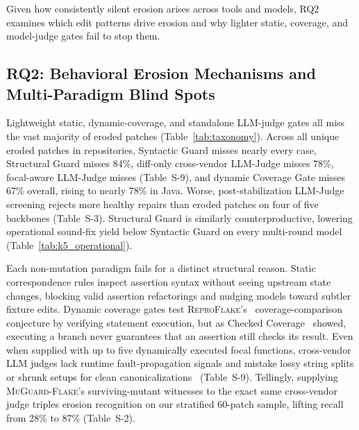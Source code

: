 

\medskip
\noindent{}
\medskip

Given how consistently silent erosion arises across tools and models, RQ2 examines which edit patterns drive erosion and why lighter static, coverage, and model-judge gates fail to stop them.

\subsection{RQ2: Behavioral Erosion Mechanisms and Multi-Paradigm Blind Spots}
\label{sec:rq2}

Lightweight static, dynamic-coverage, and standalone LLM-judge gates all miss the vast majority of eroded patches (Table~\ref{tab:taxonomy}). Across all \TaxUniquePatches{} unique eroded patches in \TaxDistinctProjects{} repositories, Syntactic Guard misses nearly every case, Structural Guard misses 84\%, diff-only cross-vendor LLM-Judge misses 78\%, focal-aware LLM-Judge misses \FocalJudgeBypassPct{} (Table~S-9), and dynamic Coverage Gate misses 67\% overall, rising to nearly 78\% in Java. Worse, post-stabilization LLM-Judge screening rejects more healthy repairs than eroded patches on four of five backbones (Table~S-3). Structural Guard is similarly counterproductive, lowering operational sound-fix yield below Syntactic Guard on every multi-round model (Table~\ref{tab:k5_operational}).

Each non-mutation paradigm fails for a distinct structural reason. Static correspondence rules inspect assertion syntax without seeing upstream state changes, blocking valid assertion refactorings and nudging models toward subtler fixture edits. Dynamic coverage gates test \textsc{ReproFlake}'s~\cite{rafi2026reproflake} coverage-comparison conjecture by verifying statement execution, but as Checked Coverage~\cite{schuler2013checked} showed, executing a branch never guarantees that an assertion still checks its result. Even when supplied with up to five dynamically executed focal functions, cross-vendor LLM judges lack runtime fault-propagation signals and mistake lossy string splits or shrunk setups for clean canonicalizations~\cite{chou2026aijudge} (Table~S-9). Tellingly, supplying \textsc{MuGuard-Flake}'s surviving-mutant witnesses to the exact same cross-vendor judge triples erosion recognition on our stratified 60-patch sample, lifting recall from 28\% to 87\% (Table~S-2).


